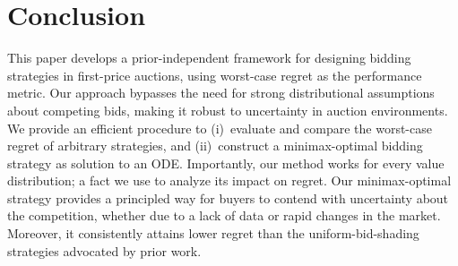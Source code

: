 \section{Conclusion}

This paper develops a prior-independent framework for designing bidding strategies in first-price auctions, using worst-case regret as the performance metric. Our approach bypasses the need for strong distributional assumptions about competing bids, making it robust to uncertainty in auction environments. We provide an efficient procedure to (i)~evaluate and compare the worst-case regret of arbitrary strategies, and (ii)~construct a minimax-optimal bidding strategy as solution to an ODE. Importantly, our method works for every value distribution; a fact we use to analyze its impact on regret. Our minimax-optimal strategy provides a principled way for buyers to contend with uncertainty about the competition, whether due to a lack of data or rapid changes in the market. Moreover, it consistently attains lower regret than the uniform-bid-shading strategies advocated by prior work.


